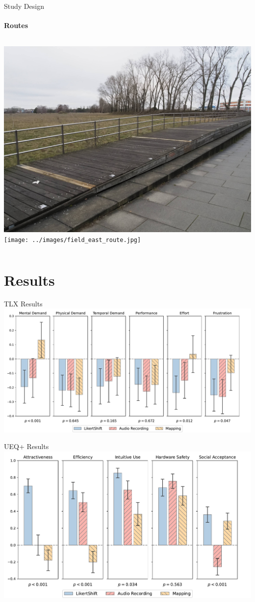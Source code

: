 \documentclass[
    english,
    accentcolor=9c,
    design=2023,
    logofile=images/hulogo.pdf,
]{tudabeamer}
\begin{document}
\begin{frame}{Study Design}
    \framesubtitle{Routes}
    \begin{columns}[onlytextwidth,c]
        \centering
        \includegraphics[height=0.7\linewidth]{../images/wood_planks_path.jpg}
        \centering
        \texttt{[image: ../images/field\_east\_route.jpg]}
    \end{columns}
\end{frame}

\section{Results}

{
    \begin{frame}{TLX Results}
        \centering
        \includegraphics[height=0.42\linewidth]{../../evaluation/eval_tlx.pdf}
    \end{frame}
}

{
    \begin{frame}{UEQ+ Results}
        \centering
        \includegraphics[height=0.42\linewidth]{../../evaluation/eval_ueq.pdf}
    \end{frame}
}
\end{document}
